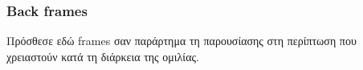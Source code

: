 
\graphicspath{{Chapter2/Figs/Vector/}}


\begin{frame}
  \frametitle{Back frames}
  \label{frcut:backframes}

Πρόσθεσε εδώ frames σαν παράρτημα τη παρουσίασης στη περίπτωση που χρειαστούν κατά τη διάρκεια της ομιλίας.

\end{frame}
\note{}










